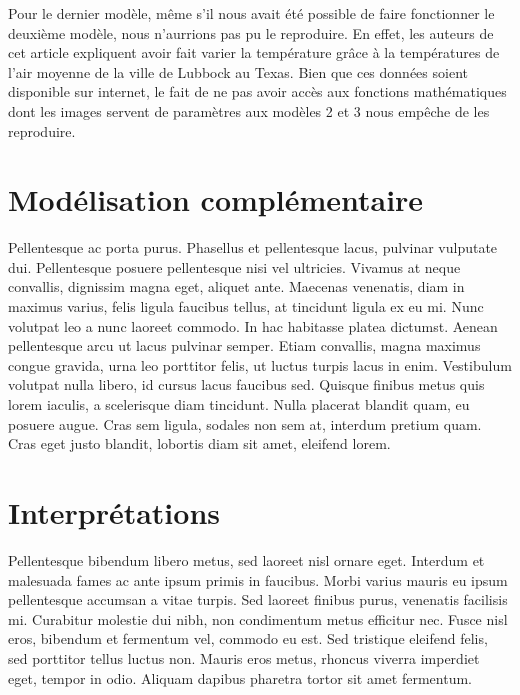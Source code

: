 \documentclass[
  12pt,
  oneside]{article}
\begin{document}
Pour le dernier modèle, même s'il nous avait été possible de faire
fonctionner le deuxième modèle, nous n'aurrions pas pu le reproduire. En
effet, les auteurs de cet article expliquent avoir fait varier la
température grâce à la températures de l'air moyenne de la ville de
Lubbock au Texas. Bien que ces données soient disponible sur internet,
le fait de ne pas avoir accès aux fonctions mathématiques dont les
images servent de paramètres aux modèles 2 et 3 nous empêche de les
reproduire.

\hypertarget{moduxe9lisation-compluxe9mentaire}{%
\section{Modélisation
complémentaire}\label{moduxe9lisation-compluxe9mentaire}}

Pellentesque ac porta purus. Phasellus et pellentesque lacus, pulvinar
vulputate dui. Pellentesque posuere pellentesque nisi vel ultricies.
Vivamus at neque convallis, dignissim magna eget, aliquet ante. Maecenas
venenatis, diam in maximus varius, felis ligula faucibus tellus, at
tincidunt ligula ex eu mi. Nunc volutpat leo a nunc laoreet commodo. In
hac habitasse platea dictumst. Aenean pellentesque arcu ut lacus
pulvinar semper. Etiam convallis, magna maximus congue gravida, urna leo
porttitor felis, ut luctus turpis lacus in enim. Vestibulum volutpat
nulla libero, id cursus lacus faucibus sed. Quisque finibus metus quis
lorem iaculis, a scelerisque diam tincidunt. Nulla placerat blandit
quam, eu posuere augue. Cras sem ligula, sodales non sem at, interdum
pretium quam. Cras eget justo blandit, lobortis diam sit amet, eleifend
lorem.

\hypertarget{interpruxe9tations}{%
\section{Interprétations}\label{interpruxe9tations}}

Pellentesque bibendum libero metus, sed laoreet nisl ornare eget.
Interdum et malesuada fames ac ante ipsum primis in faucibus. Morbi
varius mauris eu ipsum pellentesque accumsan a vitae turpis. Sed laoreet
finibus purus, venenatis facilisis mi. Curabitur molestie dui nibh, non
condimentum metus efficitur nec. Fusce nisl eros, bibendum et fermentum
vel, commodo eu est. Sed tristique eleifend felis, sed porttitor tellus
luctus non. Mauris eros metus, rhoncus viverra imperdiet eget, tempor in
odio. Aliquam dapibus pharetra tortor sit amet fermentum.
\end{document}
